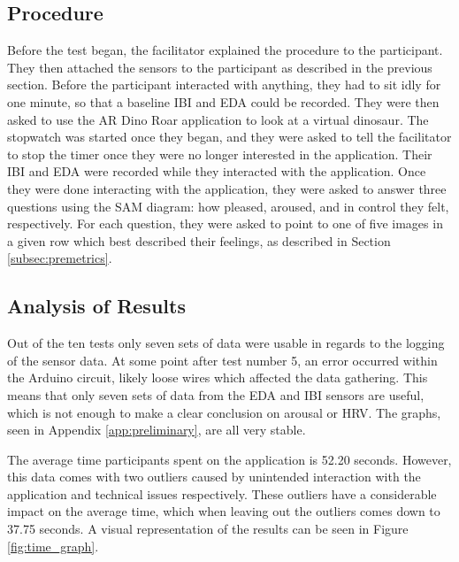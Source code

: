 \subsection{Procedure}
Before the test began, the facilitator explained the procedure to the participant. They then attached the sensors to the participant as described in the previous section. Before the participant interacted with anything, they had to sit idly for one minute, so that a baseline IBI and EDA could be recorded. They were then asked to use the AR Dino Roar application to look at a virtual dinosaur. The stopwatch was started once they began, and they were asked to tell the facilitator to stop the timer once they were no longer interested in the application. Their IBI and EDA were recorded while they interacted with the application. Once they were done interacting with the application, they were asked to answer three questions using the SAM diagram: how pleased, aroused, and in control they felt, respectively. For each question, they were asked to point to one of five images in a given row which best described their feelings, as described in Section \ref{subsec:premetrics}.

\subsection{Analysis of Results}
Out of the ten tests only seven sets of data were usable in regards to the logging of the sensor data. At some point after test number 5, an error occurred within the Arduino circuit, likely loose wires which affected the data gathering. This means that only seven sets of data from the EDA and IBI sensors are useful, which is not enough to make a clear conclusion on arousal or HRV. The graphs, seen in Appendix \ref{app:preliminary}, are all very stable.

The average time participants spent on the application is 52.20 seconds. However, this data comes with two outliers caused by unintended interaction with the application and technical issues respectively. These outliers have a considerable impact on the average time, which when leaving out the outliers comes down to 37.75 seconds. A visual representation of the results can be seen in Figure \ref{fig:time_graph}.

